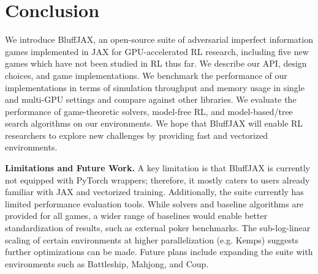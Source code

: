 \section{Conclusion}
We introduce BluffJAX, an open-source suite of adversarial imperfect information games implemented in JAX for GPU-accelerated RL research, including five new games which have not been studied in RL thus far. We describe our API, design choices, and game implementations. We benchmark the performance of our implementations in terms of simulation throughput and memory usage in single and multi-GPU settings and compare against other libraries. We evaluate the performance of game-theoretic solvers, model-free RL, and model-based/tree search algorithms on our environments. We hope that BluffJAX will enable RL researchers to explore new challenges by providing fast and vectorized environments.

\textbf{Limitations and Future Work.} A key limitation is that BluffJAX is currently not equipped with PyTorch wrappers; therefore, it mostly caters to users already familiar with JAX and vectorized training. Additionally, the suite currently has limited performance evaluation tools. While solvers and baseline algorithms are provided for all games, a wider range of baselines would enable better standardization of results, such as external poker benchmarks. The sub-log-linear scaling of certain environments at higher parallelization (e.g. Kemps) suggests further optimizations can be made. Future plans include expanding the suite with environments such as Battleship, Mahjong, and Coup.